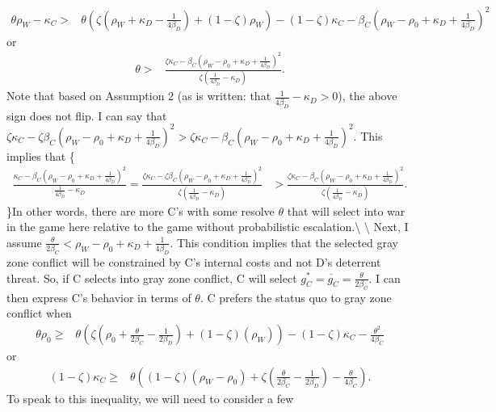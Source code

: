 \documentclass[
]{article}
\begin{document}
\begin{align*}
\theta\rho_{W}-\kappa_{C}> & \theta\left(\zeta\left(\rho_{W}+\kappa_{D}-\frac{1}{4\beta_{D}}\right)+(1-\zeta)\rho_{W}\right)-(1-\zeta)\kappa_{C}-\beta_{C}\left(\rho_{W}-\rho_{0}+\kappa_{D}+\frac{1}{4\beta_{D}}\right)^{2}
\end{align*} or \begin{align*}
\theta> & \frac{\zeta\kappa_{C}-\beta_{C}\left(\rho_{W}-\rho_{0}+\kappa_{D}+\frac{1}{4\beta_{D}}\right)^{2}}{\zeta\left(\frac{1}{4\beta_{D}}-\kappa_{D}\right)}.
\end{align*} Note that based on Assumption 2 (as is written: that
\(\frac{1}{4\beta_{D}}-\kappa_{D}>0\)), the above sign does not flip. I
can say that
\(\zeta\kappa_{C}-\zeta\beta_{C}\left(\rho_{W}-\rho_{0}+\kappa_{D}+\frac{1}{4\beta_{D}}\right)^{2}>\zeta\kappa_{C}-\beta_{C}\left(\rho_{W}-\rho_{0}+\kappa_{D}+\frac{1}{4\beta_{D}}\right)^{2}\).
This implies that \{\footnotesize{} \begin{align*}
\frac{\kappa_{C}-\beta_{C}\left(\rho_{W}-\rho_{0}+\kappa_{D}+\frac{1}{4\beta_{D}}\right)^{2}}{\frac{1}{4\beta_{D}}-\kappa_{D}}=\frac{\zeta\kappa_{C}-\zeta\beta_{C}\left(\rho_{W}-\rho_{0}+\kappa_{D}+\frac{1}{4\beta_{D}}\right)^{2}}{\zeta\left(\frac{1}{4\beta_{D}}-\kappa_{D}\right)} & >\frac{\zeta\kappa_{C}-\beta_{C}\left(\rho_{W}-\rho_{0}+\kappa_{D}+\frac{1}{4\beta_{D}}\right)^{2}}{\zeta\left(\frac{1}{4\beta_{D}}-\kappa_{D}\right)}.
\end{align*} \}In other words, there are more C's with some resolve
\(\theta\) that will select into war in the game here relative to the
game without probabilistic escalation.\textbackslash{} \textbackslash{}
Next, I assume
\(\frac{\theta}{2\beta_{C}}<\rho_{W}-\rho_{0}+\kappa_{D}+\frac{1}{4\beta_{D}}\).
This condition implies that the selected gray zone conflict will be
constrained by C's internal costs and not D's deterrent threat. So, if C
selects into gray zone conflict, C will select
\(g_{C}^{*}=\check{g_{C}}=\frac{\theta}{2\beta_{C}}\). I can then
express C's behavior in terms of \(\theta\). C prefers the status quo to
gray zone conflict when \begin{align*}
\theta\rho_{0}\geq & \theta\left(\zeta\left(\rho_{0}+\frac{\theta}{2\beta_{C}}-\frac{1}{2\beta_{D}}\right)+(1-\zeta)\left(\rho_{W}\right)\right)-(1-\zeta)\kappa_{C}-\frac{\theta^{2}}{4\beta_{C}}
\end{align*} or \begin{align*}
(1-\zeta)\kappa_{C}\geq & \theta\left((1-\zeta)(\rho_{W}-\rho_{0})+\zeta\left(\frac{\theta}{2\beta_{C}}-\frac{1}{2\beta_{D}}\right)-\frac{\theta}{4\beta_{C}}\right).
\end{align*} To speak to this inequality, we will need to consider a few
\end{document}

